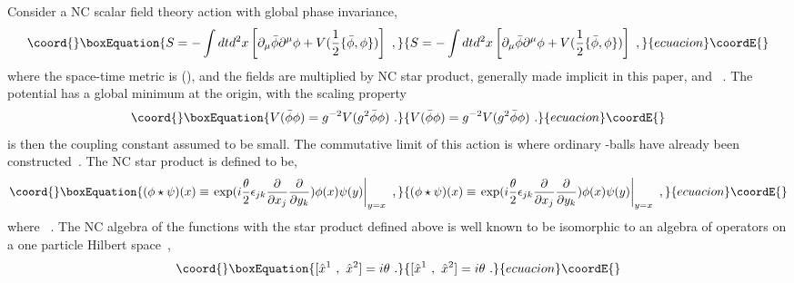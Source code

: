 \documentclass[a4paper,a4paper]{article}
\begin{document}
Consider a NC scalar field theory action with global \coordHE{} phase
invariance,
\begin{equation}\coord{}\boxEquation{
S=-\int
dtd^2x\left[\partial_\mu\bar{\phi}\partial^\mu\phi+V(\frac 12\{\bar{\phi},\phi\})\right]\
,                                                                                               \label{action}
}{
S=-\int
dtd^2x\left[\partial_\mu\bar{\phi}\partial^\mu\phi+V(\frac 12\{\bar{\phi},\phi\})\right]\
,                                                                                               }{ecuacion}\coordE{}\end{equation}
where the space-time metric is (\myHighlight{$-,+,+$}\coordHE{}), and the fields are
multiplied by NC star product, generally made implicit in this
paper, and \myHighlight{$\{A\ ,B\}\equiv A\star B+B\star A$}\coordHE{}\ . 
The potential \myHighlight{$V$}\coordHE{} has a global minimum at the origin, with the scaling property
\begin{equation}\coord{}\boxEquation{
  V(\bar{\phi}\phi)=g^{-2}V(g^2\bar{\phi}\phi)\ .                                         \label{ScalePot} 
}{
  V(\bar{\phi}\phi)=g^{-2}V(g^2\bar{\phi}\phi)\ .                                         }{ecuacion}\coordE{}\end{equation}
\coordHE{} is then the coupling constant assumed to be small. 
The commutative limit of this action is where ordinary \myHighlight{$Q$}\coordHE{}-balls have
already been constructed~\cite{LeeReport,Coleman}. The NC star product is defined to
be,
\begin{equation}\coord{}\boxEquation{
(\phi\star\psi)(x)\equiv\left.\hbox{exp}(i\frac\theta
2\epsilon_{jk}\frac\partial{\partial x_j}\frac\partial{\partial
y_k})\phi(x)\psi(y)\right|_{y=x}\ ,                                                        \label{Star}  
}{
(\phi\star\psi)(x)\equiv\left.\hbox{exp}(i\frac\theta
2\epsilon_{jk}\frac\partial{\partial x_j}\frac\partial{\partial
y_k})\phi(x)\psi(y)\right|_{y=x}\ ,                                                        }{ecuacion}\coordE{}\end{equation} where \coordHE{}\ .
The NC algebra of the functions with the star product defined above is
well known to be isomorphic to an algebra of operators on a one particle Hilbert space~\cite{Zachos},
\begin{equation}\coord{}\boxEquation{
[\hat{x}^1\ ,\ \hat{x}^2]=i\theta\ .
}{
[\hat{x}^1\ ,\ \hat{x}^2]=i\theta\ .
}{ecuacion}\coordE{}\end{equation}
\end{document}
